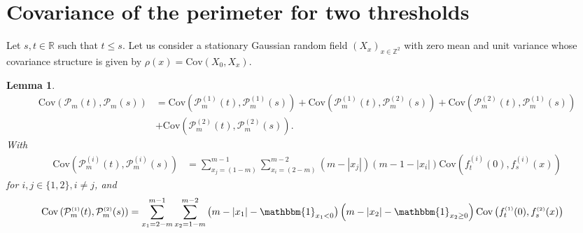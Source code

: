 \documentclass[12pt]{article}
\theoremstyle{Theorem}
\newtheorem{Lemma}[Theorem]{Lemma}
\begin{document}
\section{Covariance of the perimeter for two thresholds}
Let $s, t \in \mathbb{R}$ such that $t \leq s$. Let us consider a stationary Gaussian random field $\left(X_{\scriptscriptstyle x}\right)_{x \in \mathbb{Z}^{2}}$ with zero mean and unit variance whose covariance structure is given by $\rho(x) = \text{Cov}\left(X_{\scriptscriptstyle 0}, X_{\scriptscriptstyle x}\right)$.
\begin{Lemma} 
\label{CovLemma}
\begin{align}
\text{Cov}(\mathcal{P}_{m}(t), \mathcal{P}_{m}(s))  & = \text{Cov}(\mathcal{P}_{m}^{\scriptscriptstyle (1)}(t), \mathcal{P}_{m}^{\scriptscriptstyle (1)}(s)) + \text{Cov}(\mathcal{P}_{m}^{\scriptscriptstyle (1)}(t), \mathcal{P}_{m}^{\scriptscriptstyle (2)}(s)) + \text{Cov}(\mathcal{P}_{m}^{\scriptscriptstyle (2)}(t), \mathcal{P}_{m}^{\scriptscriptstyle (1)}(s)) \\
& + \text{Cov}(\mathcal{P}_{m}^{\scriptscriptstyle (2)}(t), \mathcal{P}_{m}^{\scriptscriptstyle (2)}(s)) .
\label{covariance}
\end{align} 
With 
\begin{align*}
\text{Cov}\left(\mathcal{P}_{m}^{\scriptscriptstyle (i)}(t),\mathcal{P}_{m}^{\scriptscriptstyle (i)}(s) \right) 
& = \sum_{x_{\scriptscriptstyle j}=\left(1-m\right)}^{m-1}\sum_{x_{\scriptscriptstyle i}=\left(2-m\right)}^{m-2}\left(m -|x_{j}|\right)\left(m - 1- |x_{i}|\right) \text{Cov}\left(f_{t}^{\scriptscriptstyle (i)}(0), f_{s}^{\scriptscriptstyle (i)}(x) \right) 
\end{align*} 
for $i,j \in\{1,2\}, i\neq j$, and 
\begin{align*}
\text{Cov}\left(\mathcal{P}_{m}^{\scriptscriptstyle (1)}(t),\mathcal{P}_{m}^{\scriptscriptstyle (2)}(s) \right) 
& = \sum_{x_1=2-m}^{m-1} \sum_{x_2 = 1-m}^{m-2} \left(m-|x_1| - \mathbbm{1}_{x_{1} < 0}\right)\left(m-|x_2|-\mathbbm{1}_{x_{2} \geq 0}\right)\text{Cov}\left(f_{t}^{\scriptscriptstyle (1)}(0), f_{s}^{ \scriptscriptstyle (2)}(x) \right)
\end{align*}
\end{Lemma}
\end{document}
